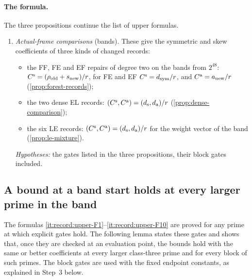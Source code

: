 \paragraph{The formula.}
The three propositions continue the list of upper formulas.
\begin{enumerate}[label=\textup{(F\arabic*)},start=9]
\item\label{it:record:upper-F9} \emph{Actual-frame comparisons} (bands). These give
 the symmetric and skew coefficients of three kinds of changed records:
 \begin{itemize}
 \item the FF, FE and EF repairs of degree two on the bands from $2^{48}$:
  $C^{\rm s}=(\rho_{\rm old}+s_{\rm new})/r$, for FE and EF $C^{\rm s}=d_{\rm sym}/r$,
  and $C^{\rm a}=a_{\rm new}/r$ (\cref{prop:forest-records});
 \item the two dense EL records: $(C^{\rm s},C^{\rm a})=(d_{\rm s},d_{\rm a})/r$
  (\cref{prop:dense-comparison});
 \item the six LE records: $(C^{\rm s},C^{\rm a})=(d_{\rm s},d_{\rm a})/r$ for the weight
  vector of the band (\cref{prop:le-mixture}).
 \end{itemize}
 \emph{Hypotheses:} the gates listed in the three propositions, their block gates
 included.
\end{enumerate}



\subsection{A bound at a band start holds at every larger prime in the band}\label{subsec:upper-domain}

The formulas \ref{it:record:upper-F1}--\ref{it:record:upper-F10} are proved
for any prime at which explicit gates hold. The following lemma states
these gates and shows that, once they are checked at an evaluation point,
the bounds hold with the same or better coefficients at every larger
class-three prime and for every block of such primes. The block gates are
used with the fixed endpoint constants, as explained in Step~3 below.

